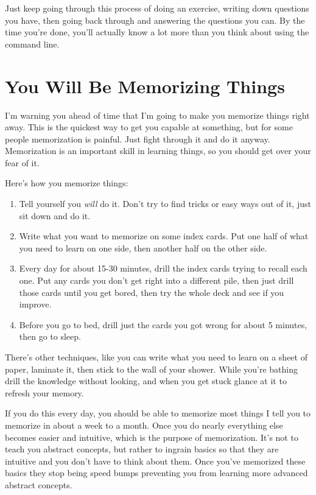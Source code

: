 Just keep going through this process of doing an exercise, writing down questions you have, then going back through and
answering the questions you can.  By the time you're done, you'll actually know a lot more than you think about
using the command line.

\section{You Will Be Memorizing Things}

I'm warning you ahead of time that I'm going to make you memorize things right away.
This is the quickest way to get you capable at something, but for some people 
memorization is painful.  Just fight through it and do it anyway.  Memorization is an
important skill in learning things, so you should get over your fear of it.

Here's how you memorize things:

\begin{enumerate}
\item Tell yourself you \emph{will} do it.  Don't try to find tricks or easy ways out of it, just sit down and do it.
\item Write what you want to memorize on some index cards.  Put one half of what you need to learn on one side, then
    another half on the other side.
\item Every day for about 15-30 minutes, drill the index cards trying to recall each one.  Put any cards you don't
    get right into a different pile, then just drill those cards until you get bored, then try the whole deck and see
    if you improve.
\item Before you go to bed, drill just the cards you got wrong for about 5 minutes, then go to sleep.
\end{enumerate}

There's other techniques, like you can write what you need to learn on a sheet of paper, laminate it, then stick to the
wall of your shower.  While you're bathing drill the knowledge without looking, and when you get stuck glance at it
to refresh your memory.

If you do this every day, you should be able to memorize most things I tell you to memorize in about a week to a
month.  Once you do nearly everything else becomes easier and intuitive, which is the purpose of memorization.
It's not to teach you abstract concepts, but rather to ingrain basics so that they are intuitive and you don't
have to think about them.  Once you've memorized these basics they stop being speed bumps preventing you from
learning more advanced abstract concepts.


